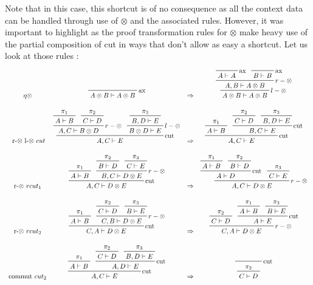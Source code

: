 \documentclass[a4paper, 12pt, twoside,openright]{report}
\begin{document}
Note that in this case, this shortcut is of no consequence as all the context data can be handled through use of $\otimes$ and the associated rules. However, it was important to highlight as the proof transformation rules for $\otimes$ make heavy use of the partial composition of cut in ways that don't allow as easy a shortcut. Let us look at those rules : 
$$%
 \begin{array}{cccc}
\eta \otimes
&
 \prftree[r]{ax}
	{A\otimes B \vdash A \otimes B} 
&
\Rightarrow
&
\prftree[r]{$l-\otimes$}
	{\prftree[r]{$r-\otimes$}
		{\prftree[r]{ax}{A\vdash A}}
		{\prftree[r]{ax}{B \vdash B}}
		{A,B \vdash A \otimes B}
	}
	{A \otimes B \vdash A \otimes B}
\\
\\
\text{ r-$\otimes$  l-$\otimes$  } cut
&
\prftree[r]{cut}
	{\prftree[r]{$r-\otimes$}
		{\prftree{\pi_1}{A\vdash B}}
		{\prftree{\pi_2}{C \vdash D}}
		{A,C \vdash B \otimes D}
	}
	{\prftree[r]{$l-\otimes$}
		{\prftree{\pi_3}{B,D \vdash E}}
		{B \otimes D \vdash E}
	}
	{A,C  \vdash E}
&
\Rightarrow
&
\prftree[r]{cut}
	{\prftree{\pi_1}{A\vdash B}}
	{\prftree[r]{cut}
		{\prftree{\pi_2}{C \vdash D}}
		{\prftree{\pi_3}{B,D \vdash E}}
		{B,C\vdash E}
	}
	{A,C\vdash E}
\\
\\
\text{r-$\otimes$ } rcut_1
&
\prftree[r]{cut}
	{\prftree{\pi_1}{A\vdash B}}
	{
	\prftree[r]{$r-\otimes$}
		{\prftree{\pi_2}{B \vdash D}}
		{\prftree{\pi_3}{C \vdash E}}
		{B,C \vdash D \otimes E}
	}
	{A,C \vdash D \otimes E}
&
\Rightarrow
&
\prftree[r]{$r-\otimes$}
	{\prftree[r]{cut}
		{\prftree{\pi_1}{A\vdash B}}
		{\prftree{\pi_2}{B \vdash D}}
		{A \vdash D}
	}
	{\prftree{\pi_3}{C \vdash E}}
	{A,C \vdash D \otimes E}
\\
\\
\text{r-$\otimes$ } rcut_2
&
\prftree[r]{cut}
	{\prftree{\pi_1}{A\vdash B}}
	{
	\prftree[r]{$r-\otimes$}
		{\prftree{\pi_2}{C \vdash D}}
		{\prftree{\pi_3}{B \vdash E}}
		{C,B \vdash D \otimes E}
	}
	{C,A \vdash D \otimes E}
&
\Rightarrow
&
\prftree[r]{$r-\otimes$}
	{\prftree{\pi_2}{C \vdash D}}
	{\prftree[r]{cut}
		{\prftree{\pi_1}{A\vdash B}}
		{\prftree{\pi_3}{B \vdash E}}
		{A \vdash E}
	}
	{C,A \vdash D \otimes E}
\\
\\
\text{commut }cut_2
&
 \prftree[r]{cut}
	{\prftree{\pi_1}{A\vdash B}}
	{\prftree[r]{cut}
		{\prftree{\pi_2}{C\vdash D}}
		{\prftree{\pi_3}{B,D\vdash E}}
		{A,D\vdash E}
	}
	{A,C 
\vdash E}
&
\Rightarrow
&
 \prftree[r]{cut}
	{\prftree{\pi_2}{C\vdash D}}

\end{array}$$
\end{document}
